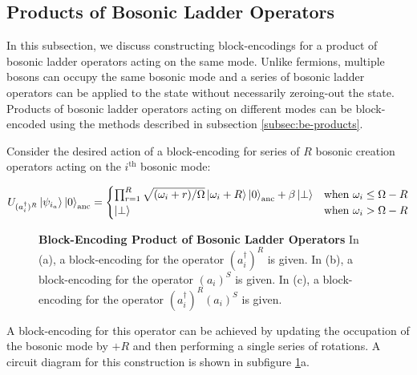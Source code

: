 \subsection{Products of Bosonic Ladder Operators}

In this subsection, we discuss constructing block-encodings for a product of bosonic ladder operators acting on the same mode.
Unlike fermions, multiple bosons can occupy the same bosonic mode and a series of bosonic ladder operators can be applied to the state without necessarily zeroing-out the state.
Products of bosonic ladder operators acting on different modes can be block-encoded using the methods described in subsection \ref{subsec:be-products}.

Consider the desired action of a block-encoding for series of $R$ bosonic creation operators acting on the $i^\text{th}$ bosonic mode:
\begin{widetext}
\begin{equation}
    \label{eq:be-S-creation-ops}
    \begin{split}
        U_{(a^\dagger_i)^R} \ket{\psi_{i_a}} \ket{0}_\text{anc} =
        \begin{cases}
            \prod_{r=1}^{R} \sqrt{(\omega_i + r) / \Omega} \ket{\omega_i + R} \ket{0}_\text{anc} + \beta \ket{\perp} & \text{when } \omega_i \leq \Omega - R \\
            \ket{\perp} & \text{when } \omega_i > \Omega - R \\
        \end{cases}
    \end{split}
\end{equation}
\end{widetext}

\begin{figure}
    
    
    
    \caption{
        \textbf{Block-Encoding Product of Bosonic Ladder Operators}
        In (a), a block-encoding for the operator $(a_i^\dagger)^R$ is given.
        In (b), a block-encoding for the operator $(a_i)^S$ is given.
        In (c), a block-encoding for the operator $(a_i^\dagger)^R (a_i)^S$ is given.
    }
    \label{fig:products-bosonic-operators}
\end{figure}

A block-encoding for this operator can be achieved by updating the occupation of the bosonic mode by $+R$ and then performing a single series of rotations.
A circuit diagram for this construction is shown in subfigure \ref{fig:products-bosonic-operators}a.

